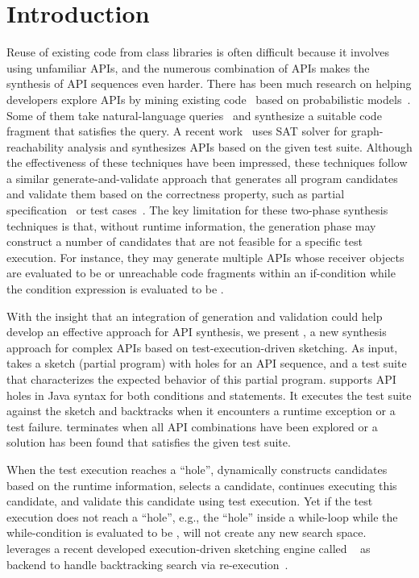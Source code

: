 \section{Introduction}


Reuse of existing code from class libraries is often difficult because it involves using unfamiliar APIs, and the  numerous combination of APIs makes the synthesis of API sequences even harder. There has been much research on helping developers explore APIs by mining existing code~\cite{strathcona:icse05, portfolio:icse13, jungloid:pldi05} based on probabilistic models~\cite{slang:pldi14, codehint:icse14}.  Some of them take  natural-language queries~\cite{sniff:fase09, freeQuery:oopsla15}   and synthesize a suitable code fragment that satisfies the query.   A recent work~\cite{isil:sypet17} uses SAT solver for graph-reachability analysis and synthesizes APIs based on the given test suite. Although the effectiveness of these techniques have been impressed, these techniques follow a similar generate-and-validate approach that generates all program candidates and validate them based on the correctness property, such as  partial specification~\cite{codehint:icse14} or test cases~\cite{isil:sypet17, testDriven:pldi14}. The key limitation for these two-phase synthesis techniques is that, without runtime information, the generation phase may construct a number of candidates  that are not feasible for a specific test execution. For instance, they may generate multiple APIs whose receiver objects are evaluated to be  or unreachable code fragments within an if-condition while the condition expression is evaluated to be . 


With the insight that an integration of generation and validation could help develop an effective approach for API synthesis, we present \tool, a new synthesis approach for complex APIs based on test-execution-driven sketching. 
As input, \tool takes a sketch (partial program) with holes for an API sequence, and a test suite that characterizes the expected behavior of this partial program. \tool supports API holes in  Java syntax for both conditions and statements. It executes the test suite against the sketch and backtracks  when it encounters a runtime exception or a test failure. \tool terminates when all API combinations have been explored or a solution has been found that satisfies the given test suite.  

 When the test execution reaches a ``hole'', \tool dynamically constructs candidates based on the runtime information, selects a candidate, continues executing this candidate, and validate this candidate using test execution. Yet if the test execution does not reach a ``hole'', e.g., the ``hole'' inside a while-loop while the while-condition is evaluated to be , \tool will not create any new search space. \tool leverages a recent developed execution-driven sketching engine  called \sj~\cite{sketch4j:spin17}  as backend to handle backtracking search via re-execution~\cite{verisoft:97}.  

